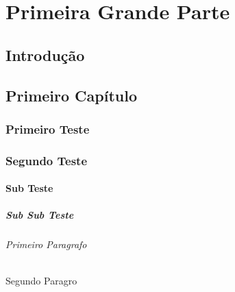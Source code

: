 \renewcommand{\contentsname}{Índice} %
\tableofcontents
\part{Primeira Grande Parte}
	\chapter*{Introdução} %
		\lipsum
		
	\chapter{Primeiro Capítulo}
		\lipsum
		\section{Primeiro Teste}
			\lipsum[1]
				
		\section{Segundo Teste}
			\subsection{Sub Teste}
				\subsubsection{Sub Sub Teste}
					\lipsum[1]
					\paragraph{Primeiro Paragrafo}
						\lipsum[1]
					\subparagraph{Segundo Paragro}
						\lipsum[1]
						
			